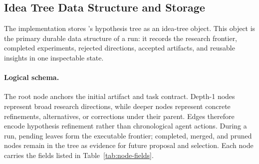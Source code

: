 \subsection{Idea Tree Data Structure and Storage}
\label{app:idea-tree-storage}

The implementation stores \arbor{}'s hypothesis tree as an idea-tree object.
This object is the primary durable data structure of a run: it records the
research frontier, completed experiments, rejected directions, accepted
artifacts, and reusable insights in one inspectable state.

\paragraph{Logical schema.}
The root node anchors the initial artifact and task contract. Depth-1 nodes
represent broad research directions, while deeper nodes represent concrete
refinements, alternatives, or corrections under their parent. Edges therefore
encode hypothesis refinement rather than chronological agent actions. During a
run, pending leaves form the executable frontier; completed, merged, and pruned
nodes remain in the tree as evidence for future proposal and selection.
Each node carries the fields listed in Table~\ref{tab:node-fields}.

